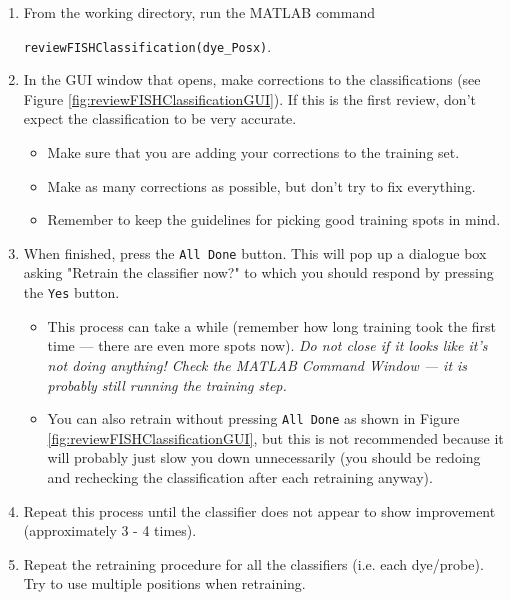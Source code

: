 \documentclass[titlepage,11pt]{article}
\begin{document}
\begin{enumerate}
\item From the working directory, run the MATLAB command 

\texttt{reviewFISHClassification(dye\_Posx)}.
\item In the GUI window that opens, make corrections to the classifications (see Figure \ref{fig:reviewFISHClassificationGUI}). If this is the first review, don't expect the classification to be very accurate.
\begin{itemize}
\item Make sure that you are adding your corrections to the training set.
\item Make as many corrections as possible, but don't try to fix everything.
\item Remember to keep the guidelines for picking good training spots in mind.
\end{itemize}
\item When finished, press the \texttt{All Done} button. This will pop up a dialogue box asking "Retrain the classifier now?" to which you should respond by pressing the \texttt{Yes} button.
\begin{itemize}
\item This process can take a while (remember how long training took the first time --- there are even more spots now). \emph{Do not close if it looks like it's not doing anything! Check the MATLAB Command Window --- it is probably still running the training step.}
\item You can also retrain without pressing \texttt{All Done} as shown in Figure \ref{fig:reviewFISHClassificationGUI}, but this is not recommended because it will probably just slow you down unnecessarily (you should be redoing and rechecking the classification after each retraining anyway). 
\end{itemize}
\item Repeat this process until the classifier does not appear to show improvement (approximately 3 - 4 times).
\item Repeat the retraining procedure for all the classifiers (i.e. each dye/probe). Try to use multiple positions when retraining.
\end{enumerate}
\end{document}
